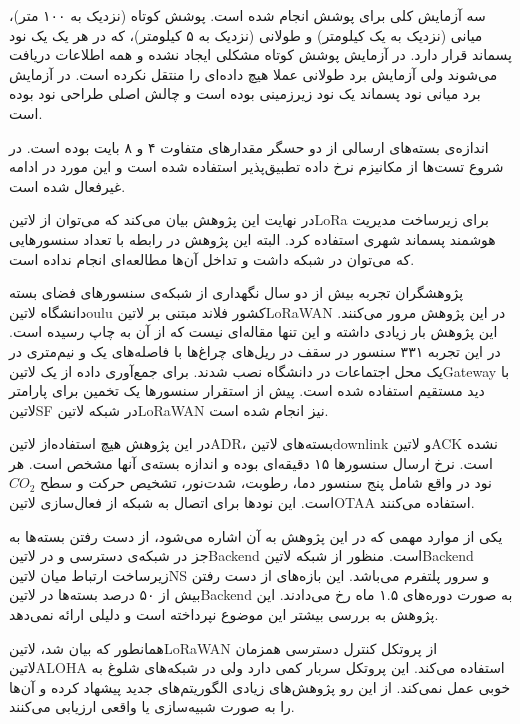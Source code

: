 سه آزمایش کلی برای پوشش انجام شده است. پوشش کوتاه (نزدیک به ۱۰۰ متر)، میانی (نزدیک به یک کیلومتر) و طولانی (نزدیک به ۵ کیلومتر)، که در هر یک یک نود پسماند قرار دارد.
در آزمایش پوشش کوتاه مشکلی ایجاد نشده و همه اطلاعات دریافت می‌شوند ولی آزمایش برد طولانی عملا هیچ داده‌ای را منتقل نکرده است.
در آزمایش برد میانی نود پسماند یک نود زیرزمینی بوده است و چالش اصلی طراحی نود بوده است.

اندازه‌ی بسته‌های ارسالی از دو حسگر مقدارهای متفاوت ۴ و ۸ بایت بوده است. در شروع تست‌ها از مکانیزم نرخ داده تطبیق‌پذیر استفاده شده است و این مورد در ادامه غیرفعال شده است.

در نهایت این پژوهش بیان می‌کند که می‌توان از ‌لاتین{LoRa} برای زیرساخت مدیریت هوشمند پسماند شهری استفاده کرد.
البته این پژوهش در رابطه با تعداد سنسورهایی که می‌توان در شبکه داشت و تداخل آن‌ها مطالعه‌ای انجام نداده است.


پژوهشگران  تجربه بیش از دو سال نگهداری از شبکه‌ی سنسورهای فضای بسته دانشگاه ‌لاتین{oulu} کشور فلاند مبتنی بر ‌لاتین{LoRaWAN} در این پژوهش مرور می‌کنند.
این پژوهش بار زیادی داشته و این تنها مقاله‌ای نیست که از آن به چاپ رسیده است. در این تجربه ۳۳۱ سنسور در سقف در ریل‌های چراغ‌ها با فاصله‌های یک و نیم‌متری در یک محل اجتماعات در دانشگاه نصب شدند.
برای جمع‌آوری داده از یک ‌لاتین{Gateway} با دید مستقیم استفاده شده است. پیش از استقرار سنسورها یک تخمین برای پارامتر ‌لاتین{SF} در شبکه ‌لاتین{LoRaWAN} نیز انجام شده است.

در این پژوهش هیچ استفاده‌از ‌لاتین{ADR}، بسته‌های ‌لاتین{downlink} و ‌لاتین{ACK} نشده است. نرخ ارسال سنسورها ۱۵ دقیقه‌ای بوده و اندازه بسته‌ی آنها مشخص است.
هر نود در واقع شامل پنج سنسور دما، رطوبت، شدت‌نور، تشخیص حرکت و سطح $CO_{2}$ است. این نودها برای اتصال به شبکه از فعال‌سازی ‌لاتین{OTAA} استفاده می‌کنند.

یکی از موارد مهمی که در این پژوهش به آن اشاره می‌شود، از دست رفتن بسته‌ها به جز در شبکه‌ی دسترسی و در ‌لاتین{Backend} است.
منظور از شبکه ‌لاتین{Backend} زیرساخت ارتباط میان ‌لاتین{NS} و سرور پلتفرم می‌باشد.
این بازه‌های از دست رفتن بیش از ۵۰ درصد بسته‌ها در ‌لاتین{Backend} به صورت دوره‌های ۱.۵ ماه رخ می‌دادند. این پژوهش به بررسی بیشتر این موضوع نپرداخته است و دلیلی ارائه نمی‌دهد.


همانطور که بیان شد، ‌لاتین{LoRaWAN} از پروتکل کنترل دسترسی همزمان ‌لاتین{ALOHA} استفاده می‌کند. این پروتکل سربار کمی دارد ولی در شبکه‌های شلوغ به خوبی عمل نمی‌کند.
از این رو پژوهش‌های زیادی الگوریتم‌های جدید پیشهاد کرده و آن‌ها را به صورت شبیه‌سازی یا واقعی ارزیابی می‌کنند.

